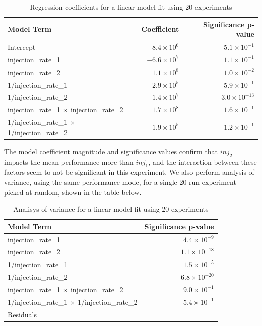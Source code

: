 \documentclass[a4paper]{article}
\begin{document}
\begin{table}[ht]
\centering
\caption{Regression coefficients for a linear model fit using 20 experiments}
\begin{tabular}{lrr}
  \toprule
Model Term & Coefficient & Significance p-value \\
  \midrule
Intercept & $8.4 \times 10^{6}$ & $5.1 \times 10^{-1}$ \\
  injection\_rate\_1 & $-6.6 \times 10^{7}$ & $1.1 \times 10^{-1}$ \\
  injection\_rate\_2 & $1.1 \times 10^{8}$ & $1.0 \times 10^{-2}$ \\
  1/injection\_rate\_1 & $2.9 \times 10^{5}$ & $5.9 \times 10^{-1}$ \\
  1/injection\_rate\_2 & $1.4 \times 10^{7}$ & $3.0 \times 10^{-13}$ \\
  injection\_rate\_1 $\times$ injection\_rate\_2 & $1.7 \times 10^{8}$ & $1.6 \times 10^{-1}$ \\
  1/injection\_rate\_1 $\times$ 1/injection\_rate\_2 & $-1.9 \times 10^{5}$ & $1.2 \times 10^{-1}$ \\
   \bottomrule
\end{tabular}
\end{table}

The  model coefficient  magnitude and  significance values  confirm that  \(inj_2\)
impacts the mean performance more than \(inj_1\), and the interaction between these
factors seem to not be significant  in this experiment. We also perform analysis
of variance,  using the same  performance mode,  for a single  20-run experiment
picked at random, shown in the table below.


\begin{table}[ht]
\centering
\caption{Analisys of variance for a linear model fit using 20 experiments}
\begin{tabular}{lr}
  \toprule
Model Term & Significance p-value \\
  \midrule
injection\_rate\_1 & $4.4 \times 10^{-9}$ \\
  injection\_rate\_2 & $1.1 \times 10^{-18}$ \\
  1/injection\_rate\_1 & $1.5 \times 10^{-5}$ \\
  1/injection\_rate\_2 & $6.8 \times 10^{-20}$ \\
  injection\_rate\_1 $\times$ injection\_rate\_2 & $9.0 \times 10^{-1}$ \\
  1/injection\_rate\_1 $\times$ 1/injection\_rate\_2 & $5.4 \times 10^{-1}$ \\
  Residuals &  \\
   \bottomrule
\end{tabular}
\end{table}
\end{document}

